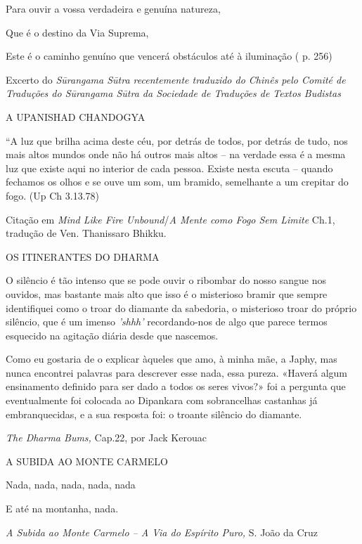 Para ouvir a vossa verdadeira e genuína natureza,

Que é o destino da Via Suprema,

Este é o caminho genuíno que vencerá obstáculos até à iluminação ( p.
256)

Excerto do \emph{Sūrangama Sūtra recentemente traduzido do Chinês pelo
Comité de Traduções do Sūrangama Sūtra da Sociedade de Traduções de
Textos Budistas }

A UPANISHAD CHANDOGYA

``A luz que brilha acima deste céu, por detrás de todos, por detrás de
tudo, nos mais altos mundos onde não há outros mais altos -- na verdade
essa é a mesma luz que existe aqui no interior de cada pessoa. Existe
nesta escuta -- quando fechamos os olhos e se ouve um som, um bramido,
semelhante a um crepitar do fogo. (Up Ch 3.13.78)

Citação em \emph{Mind Like Fire Unbound}/\emph{A Mente como Fogo Sem
Limite} Ch.1, tradução de Ven. Thanissaro Bhikku.

OS ITINERANTES DO DHARMA

O silêncio é tão intenso que se pode ouvir o ribombar do nosso sangue
nos ouvidos, mas bastante mais alto que isso é o misterioso bramir que
sempre identifiquei como o troar do diamante da sabedoria, o misterioso
troar do próprio silêncio, que é um imenso \emph{'shhh'} recordando-nos
de algo que parece termos esquecido na agitação diária desde que
nascemos.

Como eu gostaria de o explicar àqueles que amo, à minha mãe, a Japhy,
mas nunca encontrei palavras para descrever esse nada, essa pureza.
«Haverá algum ensinamento definido para ser dado a todos os seres
vivos?» foi a pergunta que eventualmente foi colocada ao Dipankara com
sobrancelhas castanhas já embranquecidas, e a sua resposta foi: o
troante silêncio do diamante.

\emph{The Dharma Bums,} Cap.22, por Jack Kerouac

A SUBIDA AO MONTE CARMELO

Nada, nada, nada, nada, nada

E até na montanha, nada.

\emph{A Subida ao Monte Carmelo -- A Via do Espírito Puro,} S. João da
Cruz
